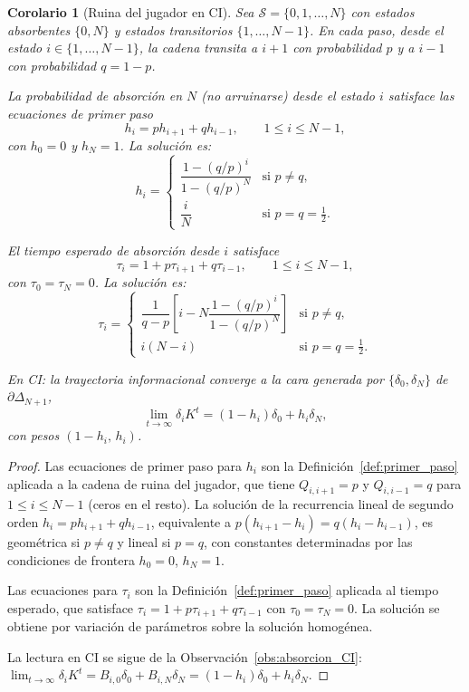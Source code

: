 ﻿\documentclass[12pt]{article}
\newtheorem{corolario}{Corolario}[section]
\begin{document}
\begin{corolario}[Ruina del jugador en CI]\label{cor:ruina_jugador}
Sea $\mathcal{S} = \{0,1,\dots,N\}$ con estados absorbentes $\{0,N\}$ y estados transitorios $\{1,\dots,N-1\}$. En cada paso, desde el estado $i\in\{1,\dots,N-1\}$, la cadena transita a $i+1$ con probabilidad $p$ y a $i-1$ con probabilidad $q=1-p$.

La probabilidad de absorción en $N$ (no arruinarse) desde el estado $i$ satisface las ecuaciones de primer paso
\[
h_i = ph_{i+1} + qh_{i-1}, \qquad 1\le i\le N-1,
\]
con $h_0=0$ y $h_N=1$. La solución es:
\[
h_i =
\begin{cases}
\dfrac{1-(q/p)^i}{1-(q/p)^N} & \text{si } p\neq q, \\[1em]
\dfrac{i}{N} & \text{si } p=q=\tfrac{1}{2}.
\end{cases}
\]

El tiempo esperado de absorción desde $i$ satisface
\[
\tau_i = 1 + p\tau_{i+1} + q\tau_{i-1}, \qquad 1\le i\le N-1,
\]
con $\tau_0=\tau_N=0$. La solución es:
\[
\tau_i =
\begin{cases}
\dfrac{1}{q-p}\!\left[i - N\dfrac{1-(q/p)^i}{1-(q/p)^N}\right] & \text{si } p\neq q, \\[1em]
i(N-i) & \text{si } p=q=\tfrac{1}{2}.
\end{cases}
\]

En CI: la trayectoria informacional converge a la cara generada por $\{\delta_0,\delta_N\}$ de $\partial\Delta_{N+1}$,
\[
\lim_{t\to\infty}\delta_i K^t = (1-h_i)\delta_0 + h_i\delta_N,
\]
con pesos $(1-h_i,\,h_i)$.
\end{corolario}

\begin{proof}
Las ecuaciones de primer paso para $h_i$ son la Definición~\ref{def:primer_paso} aplicada a la cadena de ruina del jugador, que tiene $Q_{i,i+1}=p$ y $Q_{i,i-1}=q$ para $1\le i\le N-1$ (ceros en el resto). La solución de la recurrencia lineal de segundo orden $h_i = ph_{i+1}+qh_{i-1}$, equivalente a $p(h_{i+1}-h_i) = q(h_i-h_{i-1})$, es geométrica si $p\neq q$ y lineal si $p=q$, con constantes determinadas por las condiciones de frontera $h_0=0$, $h_N=1$.

Las ecuaciones para $\tau_i$ son la Definición~\ref{def:primer_paso} aplicada al tiempo esperado, que satisface $\tau_i = 1 + p\tau_{i+1}+q\tau_{i-1}$ con $\tau_0=\tau_N=0$. La solución se obtiene por variación de parámetros sobre la solución homogénea.

La lectura en CI se sigue de la Observación~\ref{obs:absorcion_CI}: $\lim_{t\to\infty}\delta_i K^t = B_{i,0}\delta_0 + B_{i,N}\delta_N = (1-h_i)\delta_0 + h_i\delta_N$.
\end{proof}
\end{document}
